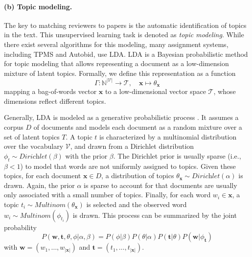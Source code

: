 \documentclass[letterpaper,twocolumn,10pt]{article}
\newcommand{\bow}{\textbf{x}}
\newcommand{\vocabulary}{\mathcal{V}}
\newcommand{\corpus}{D}
\newcommand{\corpusdoc}{\bow}
\newcommand{\corpusdoclen}{\left|\corpusdoc\right|}
\newcommand{\topicwordprior}{\beta}
\newcommand{\topicdocumentprior}{\alpha}
\newcommand{\topic}{t}
\newcommand{\topics}{T}
\newcommand{\topicspace}{\mathcal{T}}
\newcommand{\topicextractor}{\Gamma}
\newcommand{\topicworddist}{\phi}
\newcommand{\topicdocumentdist}{\theta}
\newcommand{\word}{w}
\newcommand{\prob}{P}
\begin{document}
\paragraph{(b) Topic modeling.}
The key to matching reviewers to papers is the automatic identification of topics in the text. This unsupervised learning task is denoted as \emph{topic modeling}. While there exist several algorithms for this modeling, many assignment systems, including \ac{TPMS} and Autobid, use \ac{LDA}. 
\ac{LDA} is a Bayesian probabilistic method for topic modeling that allows representing a document as a low-dimension mixture of latent topics. 
Formally, we define this representation as a function
\[ 
   \topicextractor\colon \mathbb{N}^{\left|\vocabulary\right|} \longrightarrow \topicspace, \quad 
   \bow\mapsto \topicdocumentdist_\bow
\]
mapping a bag-of-words vector $\bow$ to a low-dimensional vector space $\topicspace$, whose dimensions reflect different  topics.

Generally, \ac{LDA} is modeled as a generative probabilistic process \cite{blei-02-lda, hoffman-10-online, darling-11-theoretical}. It assumes a corpus $\corpus$ of documents and models each document as a random mixture over a set of latent topics $\topics$. A topic $\topic$ is characterized by a multinomial distribution over the vocabulary $\vocabulary$, and drawn from a Dirichlet distribution $\topicworddist_\topic \sim \textit{Dirichlet}(\topicwordprior)$ with the prior $\topicwordprior$. The Dirichlet prior is usually sparse (i.e., $\topicwordprior<1$) to model that words are not uniformly assigned to topics. Given these topics, for each document $\corpusdoc \in \corpus$, a distribution of topics $\topicdocumentdist_\corpusdoc \sim \textit{Dirichlet}(\topicdocumentprior)$ is drawn. Again, the prior $\topicdocumentprior$ is sparse to account for that documents are usually only associated with a small number of topics. Finally, for each word $\word_i \in \corpusdoc$, a topic $\topic_i \sim \textit{Multinom}(\topicdocumentdist_\corpusdoc)$ is selected and the observed word $\word_i \sim \textit{Multinom}(\topicworddist_{\topic_i})$ is drawn. 
This process can be summarized by the joint probability
\begin{equation}
    \prob(\mathbf{\word},\mathbf{\topic},\topicdocumentdist,\topicworddist|\topicdocumentprior, \topicwordprior) = \prob(\topicworddist|\topicwordprior)\prob(\topicdocumentdist|\topicdocumentprior)\prob(\mathbf{\topic}|\topicdocumentdist)\prob(\mathbf{\word}|\topicworddist_{\mathbf{\topic}})
\end{equation}
with $\mathbf{\word} = (\word_1, \dots, \word_{\corpusdoclen}) $ and $\mathbf{\topic} = (\topic_1, \dots, \topic_{\corpusdoclen})$.
\end{document}
